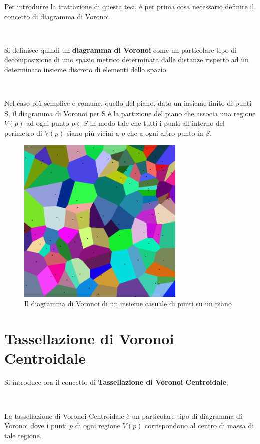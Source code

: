 \documentclass[11pt,a4paper]{report}
\begin{document}
Per introdurre la trattazione di questa tesi, è per prima cosa necessario definire il concetto di diagramma di Voronoi.

\

Si definisce quindi un \textbf{diagramma di Voronoi} come un particolare tipo di decomposizione di uno spazio metrico determinata dalle distanze rispetto ad un determinato insieme discreto di elementi dello spazio.

\

Nel caso più semplice e comune, quello del piano, dato un insieme finito di punti S, il diagramma di Voronoi per S è la partizione del piano che associa una regione $V(p)$ ad ogni punto $p \in S$ in modo tale che tutti i punti all'interno del perimetro di $V(p)$ siano più vicini a $p$ che a ogni altro punto in $S$.

\begin{figure}[H]
	\centering
	\includegraphics[width=8cm]{Coloured_Voronoi_2D.png}
	\caption{Il diagramma di Voronoi di un insieme casuale di punti su un piano}
\end{figure}

\section{Tassellazione di Voronoi Centroidale}

Si introduce ora il concetto di \textbf{Tassellazione di Voronoi Centroidale}.

\

La tassellazione di Voronoi Centroidale è un particolare tipo di diagramma di Voronoi dove i punti $p$ di ogni regione $V(p)$ corrispondono al centro di massa di tale regione.
\end{document}
